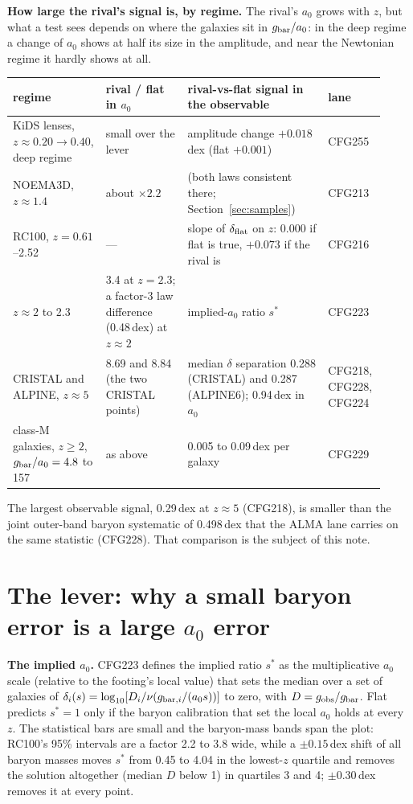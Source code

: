\documentclass[10pt]{article}
\begin{document}
\textbf{How large the rival's signal is, by regime.} The rival's $a_0$ grows with $z$, but what a test sees depends on where the galaxies sit in $g_{\rm bar}/a_0$: in the deep regime a change of $a_0$ shows at half its size in the amplitude, and near the Newtonian regime it hardly shows at all.
\begin{center}\small
\setlength{\tabcolsep}{4pt}
\begin{tabular}{L{0.23\linewidth}L{0.21\linewidth}L{0.36\linewidth}L{0.12\linewidth}}
\toprule
regime & rival / flat in $a_0$ & rival-vs-flat signal in the observable & lane \\
\midrule
KiDS lenses, $z\approx0.20\to0.40$, deep regime & small over the lever & amplitude change $+0.018$\,dex (flat $+0.001$) & CFG255 \\
NOEMA3D, $z\approx1.4$ & about $\times2.2$ & (both laws consistent there; Section~\ref{sec:samples}) & CFG213 \\
RC100, $z=0.61$--2.52 & --- & slope of $\delta_{\rm flat}$ on $z$: 0.000 if flat is true, $+0.073$ if the rival is & CFG216 \\
$z\approx2$ to 2.3 & 3.4 at $z=2.3$; a factor-3 law difference (0.48\,dex) at $z\approx2$ & implied-$a_0$ ratio $s^*$ & CFG223 \\
CRISTAL and ALPINE, $z\approx5$ & 8.69 and 8.84 (the two CRISTAL points) & median $\delta$ separation 0.288 (CRISTAL) and 0.287 (ALPINE6); 0.94\,dex in $a_0$ & CFG218, CFG228, CFG224 \\
class-M galaxies, $z\ge2$, $g_{\rm bar}/a_0=4.8$ to 157 & as above & 0.005 to 0.09\,dex per galaxy & CFG229 \\
\bottomrule
\end{tabular}
\end{center}
The largest observable signal, 0.29\,dex at $z\approx5$ (CFG218), is smaller than the joint outer-band baryon systematic of 0.498\,dex that the ALMA lane carries on the same statistic (CFG228). That comparison is the subject of this note.

\section{The lever: why a small baryon error is a large $a_0$ error}\label{sec:lever}

\textbf{The implied $a_0$.} CFG223 defines the implied ratio $s^*$ as the multiplicative $a_0$ scale (relative to the footing's local value) that sets the median over a set of galaxies of $\delta_i(s)=\log_{10}[D_i/\nu(g_{{\rm bar},i}/(a_0s))]$ to zero, with $D=g_{\rm obs}/g_{\rm bar}$. Flat predicts $s^*=1$ only if the baryon calibration that set the local $a_0$ holds at every $z$. The statistical bars are small and the baryon-mass bands span the plot: RC100's 95\% intervals are a factor 2.2 to 3.8 wide, while a $\pm0.15$\,dex shift of all baryon masses moves $s^*$ from 0.45 to 4.04 in the lowest-$z$ quartile and removes the solution altogether (median $D$ below 1) in quartiles 3 and 4; $\pm0.30$\,dex removes it at every point.
\end{document}
